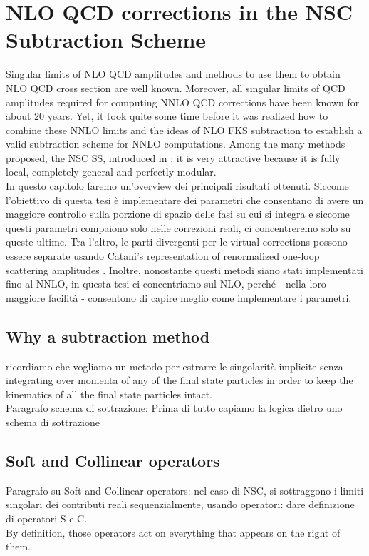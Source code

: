 \documentclass[a4paper, 12pt]{book}
\begin{document}
\clearpage

\chapter{NLO QCD corrections in the NSC Subtraction Scheme}
\label{NSC-SS}


Singular limits of NLO QCD amplitudes and methods to use them to obtain NLO QCD cross section are well known. Moreover, all singular limits of QCD amplitudes required for computing NNLO QCD corrections have been known for about 20 years. Yet, it took quite some time before it was realized how to combine these NNLO limits and the ideas of NLO FKS subtraction to establish a valid subtraction scheme for NNLO computations. Among the many methods proposed, the NSC SS, introduced in \cite{Caola:2017dug}: it is very attractive because it is fully local, completely general and perfectly modular. \\
In questo capitolo faremo un'overview dei principali risultati ottenuti. Siccome l'obiettivo di questa tesi è implementare dei parametri che consentano di avere un maggiore controllo sulla porzione di spazio delle fasi su cui si integra e siccome questi parametri compaiono solo nelle correzioni reali, ci concentreremo solo su queste ultime. Tra l'altro, le parti divergenti  per le virtual corrections possono essere separate usando Catani's representation of renormalized one-loop scattering amplitudes \cite{Catani:1998bh}. Inoltre, nonostante questi metodi siano stati implementati fino al NNLO, in questa tesi ci concentriamo sul NLO, perché - nella loro maggiore facilità - consentono di capire meglio come implementare i parametri. \\

\section{Why a subtraction method}
ricordiamo che vogliamo un metodo per estrarre le singolarità implicite senza integrating over momenta of any of the final state particles in order to keep the kinematics of all the final state particles intact. \\ 
Paragrafo schema di sottrazione:
Prima di tutto capiamo la logica dietro uno schema di sottrazione \\
\section{Soft and Collinear operators}
Paragrafo su Soft and Collinear operators:
nel caso di NSC, si sottraggono i limiti singolari dei contributi reali sequenzialmente, usando operatori: dare definizione di operatori S e C. \\
By definition, those operators act on everything that appears on the right of them.
\end{document}
